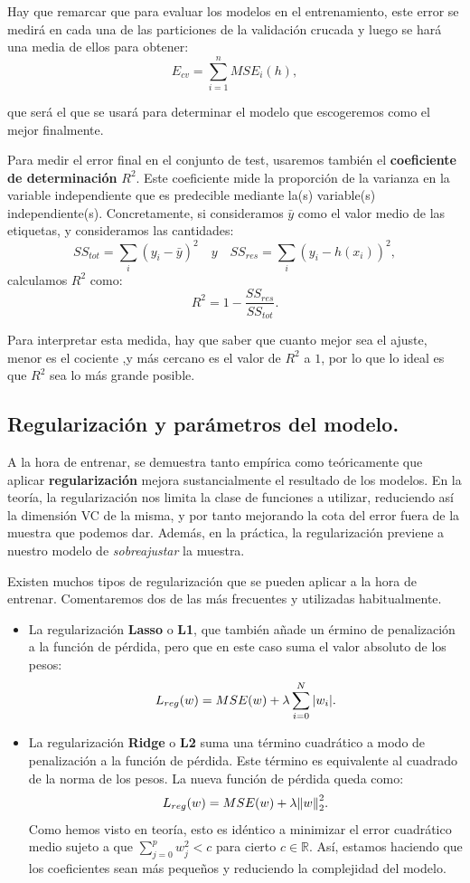 \documentclass[a4paper, 20pt]{article}
\newcommand{\R}{\mathbb R}
\begin{document}
Hay que remarcar que para evaluar los modelos en el entrenamiento, este error se medirá en cada una de las particiones de la validación crucada y luego se hará una media de ellos para obtener:
$$
E_{cv} = \sum_{i = 1}^n MSE_i(h),
$$

que será el que se usará para determinar el modelo que escogeremos como el mejor finalmente.

Para medir el error final en el conjunto de test, usaremos también el \textbf{coeficiente de determinación} $R^2$. Este coeficiente mide la proporción de la varianza en la variable independiente que es predecible mediante la(s) variable(s) independiente(s). Concretamente, si consideramos $\bar{y}$ como el valor medio de las etiquetas, y consideramos las cantidades:
\[
SS_{tot} = \sum_i(y_i - \bar{y})^2 \quad y \quad SS_{res} = \sum_i(y_i - h(x_i))^2,
\]
calculamos $R^2$ como:
$$
R^2 =  1 - \frac{SS_{res}}{SS_{tot}}.
$$

Para interpretar esta medida, hay que saber que cuanto mejor sea el ajuste, menor es el cociente ,y más cercano es el valor de $R^2$ a $1$, por lo que lo ideal es que $R^2$ sea lo más grande posible.

\subsection{Regularización y parámetros del modelo.}

A la hora de entrenar, se demuestra tanto empírica como teóricamente que aplicar \textbf{regularización} mejora sustancialmente el resultado de los modelos. En la teoría, la regularización nos limita la clase de funciones a utilizar, reduciendo así la dimensión VC de la misma, y por tanto mejorando la cota del error fuera de la muestra que podemos dar. Además, en la práctica, la regularización previene a nuestro modelo de \emph{sobreajustar} la muestra.

Existen muchos tipos de regularización que se pueden aplicar a la hora de entrenar. Comentaremos dos de las más frecuentes y utilizadas habitualmente. 

\begin{itemize}
   

    \item La regularización \textbf{Lasso} o \textbf{L1}, que también añade un érmino de penalización a la función de pérdida, pero que en este caso suma el valor absoluto de los pesos:
    $$
    L_{reg}(w) = MSE(w) + \lambda \sum_{i = 0}^N \abs{w_i}.
    $$

    \item La regularización \textbf{Ridge} o \textbf{L2} suma una término cuadrático a modo de penalización a la función de pérdida. Este término es equivalente al cuadrado de la norma de los pesos.  La nueva función de pérdida queda como:
    $$
    L_{reg}(w) = MSE(w) + \lambda \norm{w}_2^2 .
    $$
    Como hemos visto en teoría, esto es idéntico a minimizar el error cuadrático medio sujeto a que $\sum_{j = 0}^p w_j^2 < c$ para cierto $c\in \R$. Así, estamos haciendo que los coeficientes sean más pequeños y reduciendo la complejidad del modelo.
\end{itemize}
\end{document}
